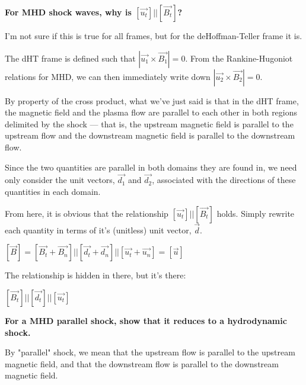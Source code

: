 \textbf{For MHD shock waves, why is $\left[\vec{u_{t}}\right] ||
\left[\vec{B_{t}}\right]$?}

I'm not sure if this is true for all frames, but for the
deHoffman-Teller frame it is.

The dHT frame is defined such that $\left| \vec{u_{1}} \times
\vec{B_{1}}\right| =
0$. From the Rankine-Hugoniot relations for MHD, we can then immediately
write down $\left| \vec{u_{2}} \times \vec{B_{2}}\right| = 0$.

By property of the cross product, what we've just said is that in the
dHT frame, the magnetic field and the plasma flow are parallel to each
other in both regions delimited by the shock --- that is, the upstream
magnetic field is parallel to the upstream flow and the downstream
magnetic field is parallel to the downstream flow.

Since the two quantities are parallel in both domains they are found in, we
need only consider the unit vectors, $\vec{d_{1}}$ and $\vec{d_{2}}$,
associated with the directions of these quantities in each domain.

From here, it is obvious that the relationship $\left[\vec{u_{t}}\right] ||
\left[\vec{B_{t}}\right]$ holds. Simply rewrite each quantity in terms
of it's (unitless) unit vector, $\vec{d}$.
\begin{center}
\begin{math}
  \left[ \vec{B} \right] = \left[ \vec{B_{t}} + \vec{B_{n}} \right] ||
  \left[ \vec{d_{t}} + \vec{d_{n}} \right] || \left[
  \vec{u_{t}}+\vec{u_{n}} \right] = \left[ \vec{u} \right]
\end{math}
\end{center}

The relationship is hidden in there, but it's there:
\begin{center}
  \begin{math}
    \left[ \vec{B_{t}} \right] || \left[ \vec{d_{t}} \right] || \left[
    \vec{u_{t}} \right]
  \end{math}
\end{center}





\textbf{For a MHD parallel shock, show that it reduces to a hydrodynamic
shock.}

By "parallel" shock, we mean that the upstream flow is parallel to the
upstream magnetic field, and that the downstream flow is parallel to the
downstream magnetic field.

